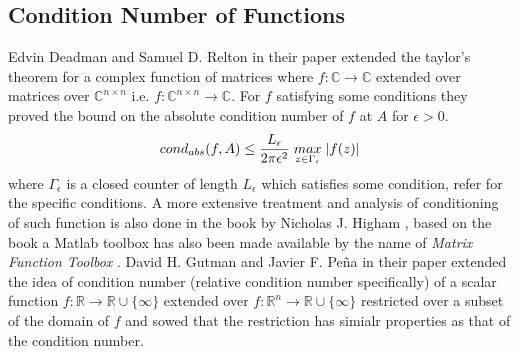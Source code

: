 \subsection{Condition Number of Functions}
Edvin Deadman and Samuel D. Relton in their paper \cite{deadman2016taylor} extended the taylor's theorem for a complex function of matrices where $f:\mathbb{C}\to \mathbb{C}$ extended over matrices over $\mathbb{C}^{n\times n}$ i.e. $f:\mathbb{C}^{n\times n}\to \mathbb{C}$. For $f$ satisfying some conditions they proved the bound on the absolute condition number of $f$ at $A$ for $\epsilon>0$.
\begin{equation}
    cond_{abs}(f,A) \le \frac{L_{\epsilon}}{2\pi\epsilon^2}\hspace{1mm}\underset{z\in \Gamma_{\epsilon}}{max}\hspace{1mm} |f(z)|
\end{equation}
where $\Gamma_{\epsilon}$ is a closed counter of length $L_{\epsilon}$ which satisfies some condition, refer \cite{deadman2016taylor} for the specific conditions. A more extensive treatment and analysis of conditioning of such function is also done in the book by Nicholas J. Higham \cite{higham2008functions}, based on the book a Matlab toolbox has also been made available by the name of \textit{Matrix Function Toolbox} \cite{highammatlabtoolbox}.
\newline \newline David H. Gutman and Javier F. Peña in their paper \cite{gutman2021condition} extended the idea of condition number (relative condition number specifically) of a scalar function $f:\mathbb{R}\to \mathbb{R}\cup \{\infty\}$ extended over $f:\mathbb{R}^n\to \mathbb{R}\cup \{\infty\}$  restricted over a subset of the domain of $f$ and sowed that the restriction has simialr properties as that of the condition number.
